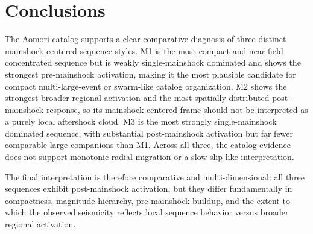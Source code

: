 \documentclass[11pt]{article}
\begin{document}
\section{Conclusions}
The Aomori catalog supports a clear comparative diagnosis of three distinct mainshock-centered sequence styles. M1 is the most compact and near-field concentrated sequence but is weakly single-mainshock dominated and shows the strongest pre-mainshock activation, making it the most plausible candidate for compact multi-large-event or swarm-like catalog organization. M2 shows the strongest broader regional activation and the most spatially distributed post-mainshock response, so its mainshock-centered frame should not be interpreted as a purely local aftershock cloud. M3 is the most strongly single-mainshock dominated sequence, with substantial post-mainshock activation but far fewer comparable large companions than M1. Across all three, the catalog evidence does not support monotonic radial migration or a slow-slip-like interpretation.

The final interpretation is therefore comparative and multi-dimensional: all three sequences exhibit post-mainshock activation, but they differ fundamentally in compactness, magnitude hierarchy, pre-mainshock buildup, and the extent to which the observed seismicity reflects local sequence behavior versus broader regional activation.
\end{document}
